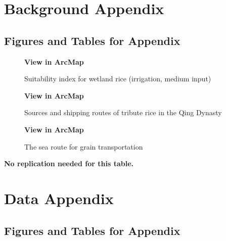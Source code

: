 \documentclass[12pt]{article}%
\begin{document}
\section{Background Appendix}
\setcounter{figure}{0}
\renewcommand{\thefigure}{\thesection \arabic{figure}}
\setcounter{table}{0}
\renewcommand{\thetable}{\thesection \arabic{table}}
\newpage
\subsection*{Figures and Tables for Appendix \thesection}
\begin{figure}[!htbp]
   \begin{center}
     \caption{Suitability index for wetland rice (irrigation, medium input)}   
     \textbf{View  in ArcMap} \\
   \end{center}
\end{figure}
\clearpage

\newpage
\begin{figure}[!htbp]
   \begin{center}
      \caption{Sources and shipping routes of tribute rice in the Qing Dynasty} 
      \textbf{View  in ArcMap} \\
    \end{center}
\end{figure}
\clearpage

\newpage
\begin{figure}[!htbp]
   \begin{center}
   \caption{The sea route for grain transportation} 
   \textbf{View  in ArcMap} \\
   \end{center}
\end{figure}
\clearpage


\begin{table}[htb] \centering
   \caption{The leading officials for and against sea transportation}
   \textbf{No replication needed for this table.}
\end{table}


\section{Data Appendix}
\setcounter{figure}{0}
\renewcommand{\thefigure}{\thesection \arabic{figure}}
\setcounter{table}{0}
\renewcommand{\thetable}{\thesection \arabic{table}}
\newpage
\subsection*{Figures and Tables for Appendix \thesection}
\end{document}

